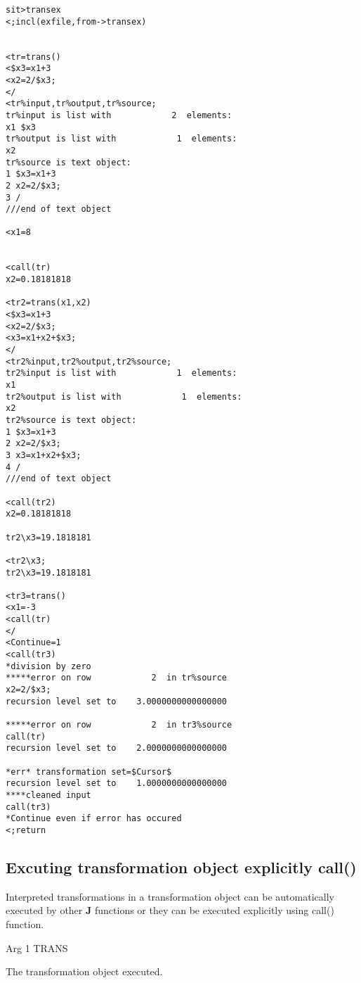 \begin{verbatim}
sit>transex
<;incl(exfile,from->transex)


<tr=trans()
<$x3=x1+3
<x2=2/$x3;
</
<tr%input,tr%output,tr%source;
tr%input is list with            2  elements:
x1 $x3
tr%output is list with            1  elements:
x2
tr%source is text object:
1 $x3=x1+3
2 x2=2/$x3;
3 /
///end of text object

<x1=8


<call(tr)
x2=0.18181818

<tr2=trans(x1,x2)
<$x3=x1+3
<x2=2/$x3;
<x3=x1+x2+$x3;
</
<tr2%input,tr2%output,tr2%source;
tr2%input is list with            1  elements:
x1
tr2%output is list with            1  elements:
x2
tr2%source is text object:
1 $x3=x1+3
2 x2=2/$x3;
3 x3=x1+x2+$x3;
4 /
///end of text object

<call(tr2)
x2=0.18181818

tr2\x3=19.1818181

<tr2\x3;
tr2\x3=19.1818181

<tr3=trans()
<x1=-3
<call(tr)
</
<Continue=1
<call(tr3)
*division by zero
*****error on row            2  in tr%source
x2=2/$x3;
recursion level set to    3.0000000000000000

*****error on row            2  in tr3%source
call(tr)
recursion level set to    2.0000000000000000

*err* transformation set=$Cursor$
recursion level set to    1.0000000000000000
****cleaned input
call(tr3)
*Continue even if error has occured
<;return
\end{verbatim}
\color{Black}
\subsection{Excuting transformation object explicitly \textcolor{VioletRed}{call}()}
\label{call}

Interpreted transformations in a transformation object can be automatically executed by other \textbf{J}
functions or they can be executed explicitly using \textcolor{VioletRed}{call}() function.

\vspace{0.3cm}
\hline
\vspace{0.3cm}
\noindent Arg \tabto{3cm} 1 \tabto{5cm}  TRANS \tabto{7cm}
\begin{changemargin}{3cm}{0cm}
\noindent  The transformation object executed.
\end {changemargin}
\hline
\vspace{0.2cm}

